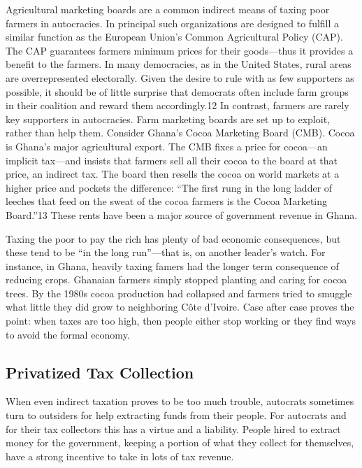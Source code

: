\documentclass[10pt]{article}
\begin{document}
{\large Agricultural marketing boards are a common indirect means of taxing poor
farmers in autocracies. In principal such organizations are designed to fulfill a
similar function as the European Union's Common Agricultural Policy (CAP). The
CAP guarantees farmers minimum prices for their goods---thus it provides a
benefit to the farmers. In many democracies, as in the United States, rural areas
are overrepresented electorally. Given the desire to rule with as few supporters
as possible, it should be of little surprise that democrats often include farm
groups in their coalition and reward them accordingly.12 In contrast, farmers are
rarely key supporters in autocracies. Farm marketing boards are set up to
exploit, rather than help them. Consider Ghana's Cocoa Marketing Board (CMB).
Cocoa is Ghana's major agricultural export. The CMB fixes a price for cocoa---an
implicit tax---and insists that farmers sell all their cocoa to the board at that
price, an indirect tax. The board then resells the cocoa on world markets at a
higher price and pockets the difference: ``The first rung in the long ladder of
leeches that feed on the sweat of the cocoa farmers is the Cocoa Marketing
Board.''13 These rents have been a major source of government revenue in Ghana.}

{\large Taxing the poor to pay the rich has plenty of bad economic consequences,
but these tend to be ``in the long run''---that is, on another leader's watch.
For instance, in Ghana, heavily taxing famers had the longer term consequence of
reducing crops. Ghanaian farmers simply stopped planting and caring for cocoa
trees. By the 1980s cocoa production had collapsed and farmers tried to smuggle
what little they did grow to neighboring C\^{o}te d'Ivoire. Case after case
proves the point: when taxes are too high, then people either stop working or
they find ways to avoid the formal economy.}

\subsection{Privatized Tax Collection}

{\large When even indirect taxation proves to be too much trouble, autocrats
sometimes turn to outsiders for help extracting funds from their people. For
autocrats and for their tax collectors this has a virtue and a liability. People
hired to extract money for the government, keeping a portion of what they collect
for themselves, have a strong incentive to take in lots of tax revenue.}
\end{document}
